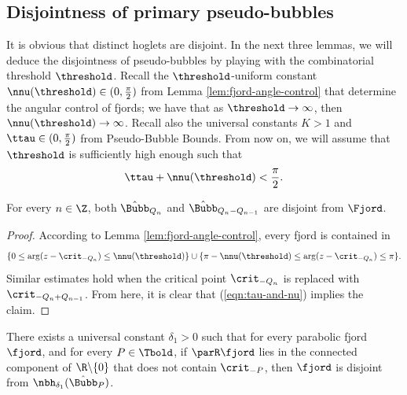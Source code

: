 \documentclass{amsart}
\begin{document}
\subsection{Disjointness of primary pseudo-bubbles}
\label{ss:disjointness-of-pseudo-bubbles}

It is obvious that distinct hoglets are disjoint.
In the next three lemmas, we will deduce the disjointness of pseudo-bubbles by playing with the combinatorial threshold $\threshold$.
Recall the $\threshold$-uniform constant $\nnu(\threshold) \in (0,\frac{\pi}{2})$ from Lemma \ref{lem:fjord-angle-control} that determine the angular control of fjords; we have that as $\threshold \to \infty$, then $\nnu(\threshold) \to \infty$.
Recall also the universal constants $K>1$ and $\ttau \in (0,\frac{\pi}{2})$ from Pseudo-Bubble Bounds.
From now on, we will assume that $\threshold$ is sufficiently high enough such that
\begin{equation}
\label{eqn:tau-and-nu}
    \ttau + \nnu(\threshold) < \frac{\pi}{2}.
\end{equation}

\begin{lemma}
    \label{lem:main-bubble-disjoint-fjord}
    For every $n\in\Z$, both $\hat{\Bubb}_{Q_n}$ and $\hat{\Bubb}_{Q_n-Q_{n-1}}$ are disjoint from $\Fjord$.
\end{lemma}

\begin{proof}
    According to Lemma \ref{lem:fjord-angle-control}, every fjord is contained in
    \[
        \{ 0 \leq \arg (z-\crit_{-Q_n}) \leq \nnu(\threshold)\} \cup \{\pi - \nnu(\threshold) \leq \arg (z-\crit_{-Q_n})  \leq \pi \}.
    \]
    Similar estimates hold when the critical point $\crit_{-Q_n}$ is replaced with $\crit_{-Q_n+Q_{n-1}}$.
    From here, it is clear that (\ref{eqn:tau-and-nu}) implies the claim.
\end{proof}

\begin{lemma}
\label{lem:bubble-disjoint-fjord}
    There exists a universal constant $\delta_1>0$ such that for every parabolic fjord $\fjord$, and for every $P \in \Tbold$,
    if $\parR \fjord$ lies in the connected component of $\R \backslash \{ 0 \}$ that does not contain $\crit_{-P}$, then
    $\fjord$ is disjoint from $\nbh_{\delta_1}(\hat{\Bubb}_P)$.
\end{lemma}
\end{document}
